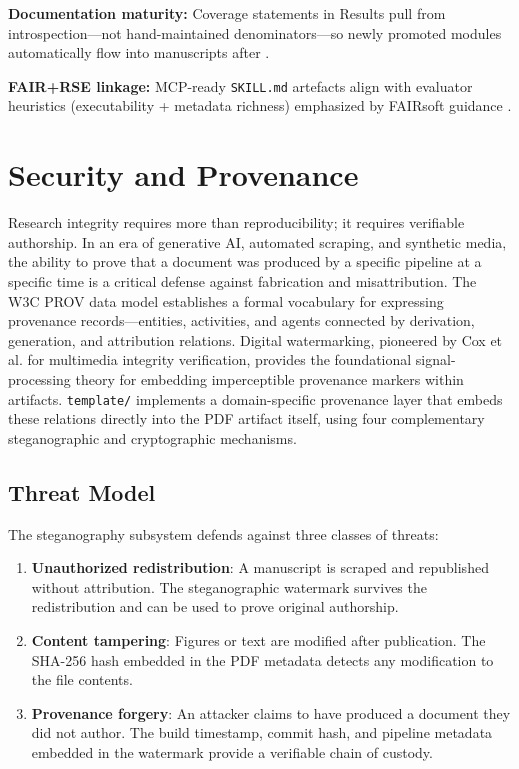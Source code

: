 \documentclass[
  english,
]{article}
\providecommand{\tightlist}{%
  \setlength{\itemsep}{0pt}\setlength{\parskip}{0pt}}
\begin{document}
\textbf{Documentation maturity:} Coverage statements in Results pull
from introspection---not hand-maintained denominators---so newly
promoted modules automatically flow into manuscripts after
.

\textbf{FAIR+RSE linkage:} MCP-ready \texttt{SKILL.md} artefacts align
with evaluator heuristics (executability + metadata richness) emphasized
by FAIRsoft guidance \citep{garijo2024fairsoft}.

\newpage

\section{Security and Provenance}\label{security-and-provenance}

Research integrity requires more than reproducibility; it requires
verifiable authorship. In an era of generative AI, automated scraping,
and synthetic media, the ability to prove that a document was produced
by a specific pipeline at a specific time is a critical defense against
fabrication and misattribution. The W3C PROV data model
\citep{moreau2013provdm} establishes a formal vocabulary for expressing
provenance records---entities, activities, and agents connected by
derivation, generation, and attribution relations. Digital watermarking,
pioneered by Cox et al. \citep{cox1997secure} for multimedia integrity
verification, provides the foundational signal-processing theory for
embedding imperceptible provenance markers within artifacts.
\texttt{template/} implements a domain-specific provenance layer that
embeds these relations directly into the PDF artifact itself, using four
complementary steganographic and cryptographic mechanisms.

\subsection{Threat Model}\label{threat-model}

The steganography subsystem defends against three classes of threats:

\begin{enumerate}
\def\labelenumi{\arabic{enumi}.}
\tightlist
\item
  \textbf{Unauthorized redistribution}: A manuscript is scraped and
  republished without attribution. The steganographic watermark survives
  the redistribution and can be used to prove original authorship.
\item
  \textbf{Content tampering}: Figures or text are modified after
  publication. The SHA-256 hash embedded in the PDF metadata detects any
  modification to the file contents.
\item
  \textbf{Provenance forgery}: An attacker claims to have produced a
  document they did not author. The build timestamp, commit hash, and
  pipeline metadata embedded in the watermark provide a verifiable chain
  of custody.
\end{enumerate}
\end{document}
